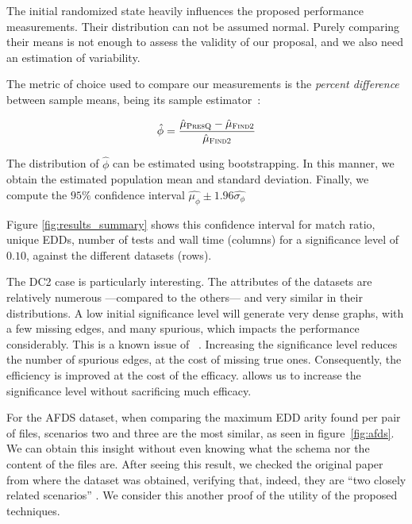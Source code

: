 The initial randomized state heavily influences the proposed performance measurements.
Their distribution can not be assumed normal.
Purely comparing their means is not enough to assess the validity of our proposal, and we also need an estimation of variability.

The metric of choice used to compare our measurements is the \emph{percent difference}
between sample means, being its sample estimator~\cite{campelo_sample_2019}:

\begin{equation}
    \label{eq:percent_difference}
    \hat{\phi} = \frac{\hat{\mu}_{\textsc{PresQ}} - \hat{\mu}_{\textsc{Find2}}}{\hat{\mu}_{\textsc{Find2}}}
\end{equation}

The distribution of
$\hat{\phi}$ can be estimated using bootstrapping.
In this manner, we obtain the estimated population mean and standard deviation. Finally,
we compute the $95\%$ confidence interval $\hat{\mu_\phi} \pm 1.96 \hat{\sigma_\phi}$

Figure \ref{fig:results_summary} shows this confidence interval for match ratio, unique EDDs,
number of tests and wall time (columns) for a significance level of $0.10$, against the
different datasets (rows).

The DC2 case is particularly interesting. The attributes of the datasets
are relatively numerous ---compared to the others--- and very similar in their distributions.
A low initial significance level will generate very dense graphs, with a few missing edges, and
many spurious, which impacts the performance considerably.
This is a known issue of \Find~\cite{koeller2006heuristic}.
Increasing the significance level reduces the number of spurious edges, at the cost of
missing true ones. Consequently, the efficiency is improved at the cost of the efficacy.
\PresQ allows us to increase the significance
level without sacrificing much efficacy.

For the AFDS dataset, when comparing the maximum EDD arity found per pair of files,
scenarios two and three are the most similar, as seen in figure~\ref{fig:afds}.
We can obtain this insight without even knowing what the schema nor the content of the files are.
After seeing this result, we checked the original paper from
where the dataset was obtained, verifying that, indeed, they are
``two closely related scenarios'' \cite{Gheraibia2019}.
We consider this another proof of the utility of the proposed techniques.

